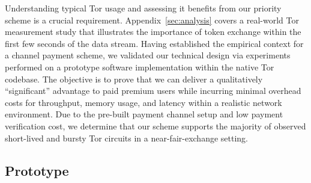 Understanding typical Tor usage and assessing it benefits from our priority scheme is a crucial requirement.
Appendix~\ref{sec:analysis} covers a real-world Tor measurement study
that illustrates the importance of token exchange within the first few seconds of the data stream.
Having established the empirical context for a channel payment scheme, we validated our technical design via experiments performed on a prototype software implementation within the native Tor codebase.
The objective is to prove that we can deliver a qualitatively ``significant'' advantage to paid premium users while incurring minimal overhead costs for throughput, memory usage, and latency within a realistic network environment.
Due to the pre-built payment channel setup and low payment verification cost, we determine that our scheme supports the majority of observed short-lived and bursty Tor circuits in a near-fair-exchange setting.

\subsection{Prototype}

